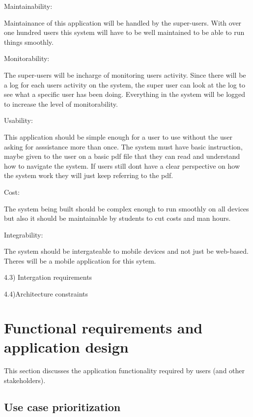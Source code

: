 \documentclass[a4paper,12pt]{report}
\begin{document}
Maintainability:

Maintainance of this application will be handled by the super-users. With over one hundred users this system will have to be well maintained to be able to run things smoothly.

Monitorability:

The super-users will be incharge of monitoring users activity. Since there will be a log for each users activity on the system, the super user can look at the log to see what a specific user has been doing. Everything in the system will be logged to increase the level of monitorability.

Usability:

This application should be simple enough for a user to use without the user asking for asssistance more than once. The system must have basic instruction, maybe given to the user on a basic pdf file that they can read and understand how to navigate the system. If users still dont have a clear perspective on how the system work they will just keep referring to the pdf.

Cost:

The system being built should be complex enough to run smoothly on all devices but also it should be maintainable by students to cut costs and man hours.

Integrability:

The system should be intergateable to mobile devices and not just be web-based. Theres will be a mobile application for this sytem.


4.3) Intergation requirements





4.4)Architecture constraints

\newpage
\section{Functional requirements and application design}
This section discusses the application functionality required by users (and other stakeholders).

\subsection{Use case prioritization}
\end{document}
